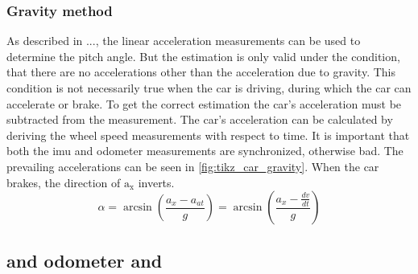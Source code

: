 \subsubsection{Gravity method}
\label{subsubsec:gravity_method}
As described in ..., the linear acceleration measurements can be used to determine the pitch angle.
But the estimation is only valid under the condition, that there are no accelerations other than the acceleration due to gravity.
This condition is not necessarily true when the car is driving, during which the car can accelerate or brake.
To get the correct estimation the car's acceleration must be subtracted from the measurement.
The car's acceleration can be calculated by deriving the wheel speed measurements with respect to time.
It is important that both the \gls{imu} and odometer measurements are synchronized, otherwise bad.
The prevailing accelerations can be seen in \cref{fig:tikz_car_gravity}.
When the car brakes, the direction of $\mathrm{a}_\mathrm{x}$ inverts.
\begin{equation}
	\alpha = \arcsin\left(\frac{a_x-a_{at}}{g}\right)
	= \arcsin\left(\frac{a_x-\frac{dv}{dt}}{g}\right)
\end{equation}


\subsection{ and odometer and }
